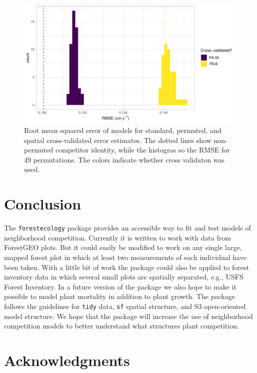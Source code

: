 \documentclass[12pt]{article}
\begin{document}
\begin{figure}

{\centering \includegraphics[width=1\linewidth]{simulation_results/2021-03-03_scbi_49_shuffles} 

}

\caption{Root mean squared error of models for standard, permuted, and spatial cross-validated error estimates. The dotted lines show non-permuted competitor identity, while the histogras so the RMSE for 49 permutations. The colors indicate whether cross validaton was used.}\label{fig:scbi-simulation}
\end{figure}

\hypertarget{conclusion}{%
\section{Conclusion}\label{conclusion}}

The \texttt{forestecology} package provides an accessible way to fit and
test models of neighborhood competition. Currently it is written to work
with data from ForestGEO plots. But it could easily be modified to work
on any single large, mapped forest plot in which at least two
measurements of each individual have been taken. With a little bit of
work the package could also be applied to forest inventory data in which
several small plots are spatially separated, e.g., USFS Forest
Inventory. In a future version of the package we also hope to make it
possible to model plant mortality in addition to plant growth. The
package follows the guidelines for \texttt{tidy} data, \texttt{sf}
spatial structure, and S3 open-oriented model structure. We hope that
the package will increase the use of neighborhood competition models to
better understand what structures plant competition.

\hypertarget{acknowledgments}{%
\section{Acknowledgments}\label{acknowledgments}}
\end{document}
